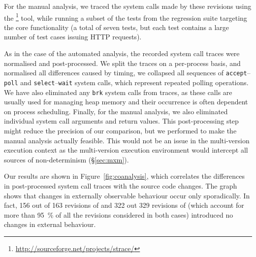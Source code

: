 
For the manual analysis, we traced the system calls made by these revisions
using the \strace\footnote{\url{http://sourceforge.net/projects/strace/}} tool,
while running a subset of the tests from the \lighttpd regression suite targeting
the core functionality (a total of seven tests, but each test contains a large
number of test cases issuing HTTP requests).


As in the case of the automated analysis, the recorded system call traces
were normalised and post-processed. We split the traces on a per-process basis,
and normalised all differences caused by timing, \eg we collapsed all sequences
of \lstinline`accept`--\lstinline`poll` and
\lstinline`select`--\lstinline`wait` system calls, which represent repeated
polling operations. We have also eliminated any \lstinline`brk` system calls
from traces, as these calls are usually used for managing heap memory and their
occurrence is often dependent on process scheduling.  Finally, for the manual
analysis, we also eliminated individual system call arguments and return
values. This post-processing step might reduce the precision of our comparison,
but we performed to make the manual analysis actually feasible. This would not
be an issue in the multi-version execution context as the multi-version
execution environment would intercept all sources of non-determinism
(\S\ref{sec:mxm}).

Our results are shown in Figure~\ref{fig:coanalysis}, which correlates the
differences in post-processed system call traces with the source code changes.
The graph shows that changes in externally observable behaviour occur only
sporadically. In fact, 156 out of 163 revisions of \lighttpd and 322 out 329
revisions of \vim (which account for more than \SI{95}{\percent} of all the
revisions considered in both cases) introduced no changes in external
behaviour.


